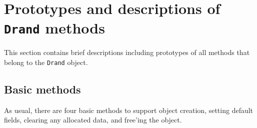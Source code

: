 \par
\section{Prototypes and descriptions of {\tt Drand} methods}
\label{section:Drand:proto}
\par
This section contains brief descriptions including prototypes
of all methods that belong to the {\tt Drand} object.
\par
\subsection{Basic methods}
\label{subsection:Drand:proto:basics}
\par
As usual, there are four basic methods to support object creation,
setting default fields, clearing any allocated data, and free'ing
the object.
\par
